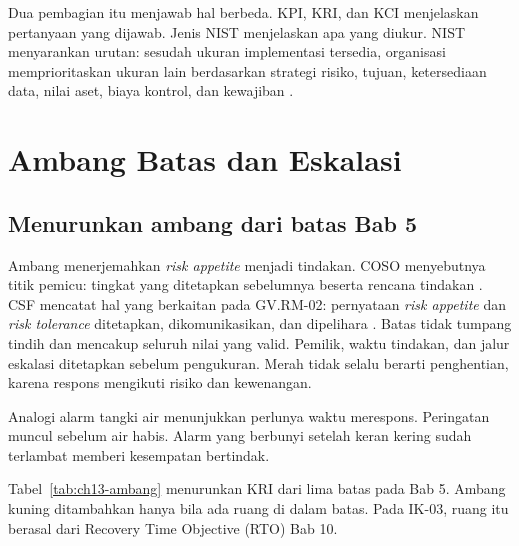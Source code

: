 Dua pembagian itu menjawab hal berbeda. KPI, KRI, dan KCI menjelaskan pertanyaan yang dijawab. Jenis
NIST menjelaskan apa yang diukur. NIST menyarankan urutan: sesudah ukuran implementasi tersedia,
organisasi memprioritaskan ukuran lain berdasarkan strategi risiko, tujuan, ketersediaan data, nilai
aset, biaya kontrol, dan kewajiban \cite{c13-nist80055v1}.

\section{Ambang Batas dan Eskalasi}

\subsection*{Menurunkan ambang dari batas Bab 5}

Ambang menerjemahkan \textit{risk appetite} menjadi tindakan. COSO menyebutnya titik pemicu: tingkat
yang ditetapkan sebelumnya beserta rencana tindakan \cite{c13-coso-kri}. CSF mencatat hal yang
berkaitan pada GV.RM-02: pernyataan \textit{risk appetite} dan \textit{risk tolerance} ditetapkan,
dikomunikasikan, dan dipelihara \cite{nistcsf2}. Batas tidak tumpang tindih dan mencakup seluruh
nilai yang valid. Pemilik, waktu tindakan, dan jalur eskalasi ditetapkan sebelum pengukuran. Merah
tidak selalu berarti penghentian, karena respons mengikuti risiko dan kewenangan.

Analogi alarm tangki air menunjukkan perlunya waktu merespons. Peringatan muncul sebelum air habis.
Alarm yang berbunyi setelah keran kering sudah terlambat memberi kesempatan bertindak.

Tabel~\ref{tab:ch13-ambang} menurunkan KRI dari lima batas pada Bab 5. Ambang kuning ditambahkan
hanya bila ada ruang di dalam batas. Pada IK-03, ruang itu berasal dari Recovery Time Objective
(RTO) Bab 10.

